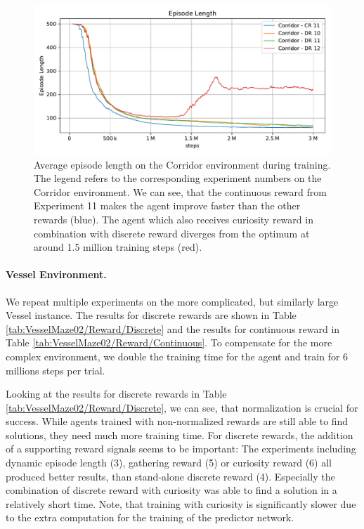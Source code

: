 \begin{figure}[htp]
    
    \begin{center}
        \includegraphics[clip, width=0.75\columnwidth]{figures/evaluation/rewards/continuous_vs_discrete.pdf}
    \end{center}
    
    \caption[Training Curves with Curiosity Reward]{Average episode length on the Corridor environment during training. The legend refers to the corresponding experiment numbers on the Corridor environment. We can see, that the continuous reward from Experiment 11 makes the agent improve faster than the other rewards (blue). The agent which also receives curiosity reward in combination with discrete reward diverges from the optimum at around 1.5 million training steps (red).}
    \label{fig:ContinuousVsDiscrete}
\end{figure}


\paragraph{Vessel Environment.} We repeat multiple experiments on the more complicated, but similarly large Vessel instance. The results for discrete rewards are shown in Table \ref{tab:VesselMaze02/Reward/Discrete} and the results for continuous reward in Table \ref{tab:VesselMaze02/Reward/Continuous}. To compensate for the more complex environment, we double the training time for the agent and train for 6 millions steps per trial. 

Looking at the results for discrete rewards in Table \ref{tab:VesselMaze02/Reward/Discrete}, we can see, that normalization is crucial for success. While agents trained with non-normalized rewards are still able to find solutions, they need much more training time. For discrete rewards, the addition of a supporting reward signals seems to be important: The experiments including dynamic episode length (3), gathering reward (5) or curiosity reward (6) all produced better results, than stand-alone discrete reward (4). Especially the combination of discrete reward with curiosity was able to find a solution in a relatively short time. Note, that training with curiosity is significantly slower due to the extra computation for the training of the predictor network. 

